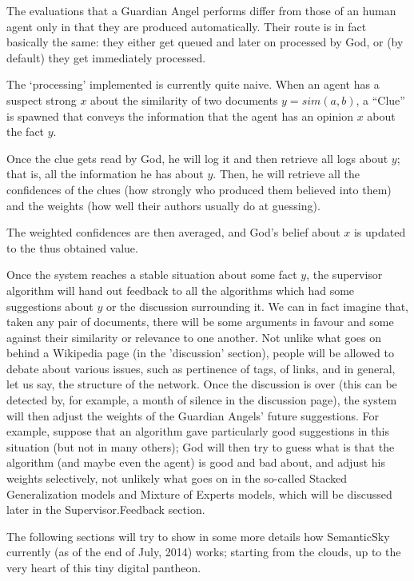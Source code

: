 \documentclass[11pt]{article}
\begin{document}
The evaluations that a Guardian Angel performs differ from those of an human agent only in that they are produced automatically. Their route is in fact basically the same: they either get queued and later on processed by God, or (by default) they get immediately processed.

The `processing' implemented is currently quite naive. When an agent has a suspect strong $x$ about the similarity of two documents $y=sim(a,b)$, a ``Clue'' is spawned that conveys the information that the agent has an opinion $x$ about the fact $y$.

Once the clue gets read by God, he will log it and then retrieve all logs about $y$; that is, all the information he has about $y$. Then, he will retrieve all the confidences of the clues (how strongly who produced them believed into them) and the weights (how well their authors usually do at guessing).

The weighted confidences are then averaged, and God's belief about $x$ is updated to the thus obtained value.

Once the system reaches a stable situation about some fact $y$, the supervisor algorithm will hand out feedback to all the algorithms which had some suggestions about $y$ or the discussion surrounding it. We can in fact imagine that, taken any pair of documents, there will be some arguments in favour and some against their similarity or relevance to one another. Not unlike what goes on behind a Wikipedia page (in the 'discussion' section), people will be allowed to debate about various issues, such as pertinence of tags, of links, and in general, let us say, the structure of the network. 
Once the discussion is over (this can be detected by, for example, a month of silence in the discussion page), the system will then adjust the weights of the Guardian Angels' future suggestions. For example, suppose that an algorithm gave particularly good suggestions in this situation (but not in many others); God will then try to guess what is that the algorithm (and maybe even the agent) is good and bad about, and adjust his weights selectively, not unlikely what goes on in the so-called Stacked Generalization models and Mixture of Experts models, which will be discussed later in the Supervisor.Feedback section.

The following sections will try to show in some more details how SemanticSky currently (as of the end of July, 2014) works; starting from the clouds, up to the very heart of this tiny digital pantheon.
\end{document}
